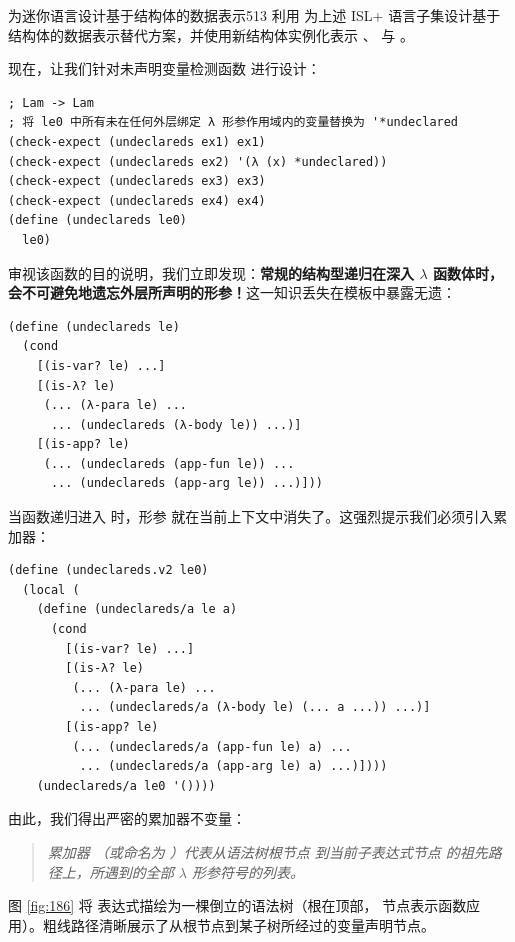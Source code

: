 \begin{exercise}{为迷你语言设计基于结构体的数据表示}{513}
利用  为上述 ISL+ 语言子集设计基于结构体的数据表示替代方案，并使用新结构体实例化表示 、 与 。
\end{exercise}

现在，让我们针对未声明变量检测函数  进行设计：

\begin{lstlisting}[language=BSL]
; Lam -> Lam
; 将 le0 中所有未在任何外层绑定 λ 形参作用域内的变量替换为 '*undeclared
(check-expect (undeclareds ex1) ex1)
(check-expect (undeclareds ex2) '(λ (x) *undeclared))
(check-expect (undeclareds ex3) ex3)
(check-expect (undeclareds ex4) ex4)
(define (undeclareds le0)
  le0)
\end{lstlisting}

审视该函数的目的说明，我们立即发现：\textbf{常规的结构型递归在深入 $\lambda$ 函数体时，会不可避免地遗忘外层所声明的形参！}这一知识丢失在模板中暴露无遗：

\begin{lstlisting}[language=BSL]
(define (undeclareds le)
  (cond
    [(is-var? le) ...]
    [(is-λ? le)
     (... (λ-para le) ...
      ... (undeclareds (λ-body le)) ...)]
    [(is-app? le)
     (... (undeclareds (app-fun le)) ...
      ... (undeclareds (app-arg le)) ...)]))
\end{lstlisting}

当函数递归进入  时，形参  就在当前上下文中消失了。这强烈提示我们必须引入累加器：

\begin{lstlisting}[language=BSL]
(define (undeclareds.v2 le0)
  (local (
    (define (undeclareds/a le a)
      (cond
        [(is-var? le) ...]
        [(is-λ? le)
         (... (λ-para le) ...
          ... (undeclareds/a (λ-body le) (... a ...)) ...)]
        [(is-app? le)
         (... (undeclareds/a (app-fun le) a) ...
          ... (undeclareds/a (app-arg le) a) ...)])))
    (undeclareds/a le0 '())))
\end{lstlisting}

由此，我们得出严密的累加器不变量：
\begin{quote}
\textit{累加器 （或命名为 ）代表从语法树根节点  到当前子表达式节点  的祖先路径上，所遇到的全部 $\lambda$ 形参符号的列表。}
\end{quote}

图 \ref{fig:186} 将  表达式描绘为一棵倒立的语法树（根在顶部， 节点表示函数应用）。粗线路径清晰展示了从根节点到某子树所经过的变量声明节点。

